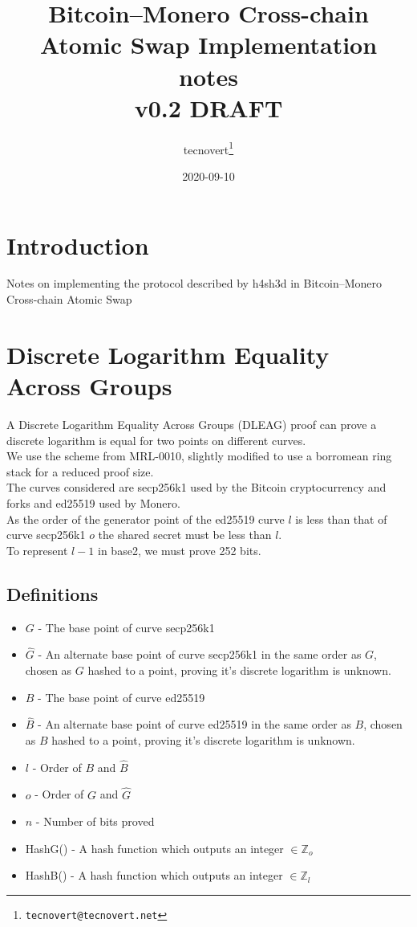 \documentclass[a4paper]{article}
\title{Bitcoin–Monero Cross-chain Atomic Swap Implementation notes\\
\normalsize v0.2 DRAFT}
\author{%
tecnovert\footnote{\texttt{tecnovert@tecnovert.net}}
}
\date{2020-09-10}
\begin{document}
\maketitle

\section{Introduction}
Notes on implementing the protocol described by h4sh3d in Bitcoin–Monero Cross-chain Atomic Swap\cite{h4sh3d:1}


\section{Discrete Logarithm Equality Across Groups}
A Discrete Logarithm Equality Across Groups (DLEAG) proof can prove a discrete logarithm is equal for two points on different curves.\\
We use the scheme from MRL-0010\cite{MRL:10}, slightly modified to use a borromean\cite{borromean} ring stack for a reduced proof size.
\\
The curves considered are secp256k1\cite{CerRes10} used by the Bitcoin\cite{nakamoto2008bitcoin} cryptocurrency and forks and ed25519\cite{ches-2011-24091} used by Monero\cite{van2013cryptonote}.\\
As the order of the generator point of the ed25519 curve $l$ is less than that of curve secp256k1 $o$ the shared secret must be less than $ l $.\\
To represent $l-1$ in base2, we must prove 252 bits.\\

\subsection{Definitions}
\begin{itemize}
    \item $G$   - The base point of curve secp256k1
    \item $\hat{G}$  - An alternate base point of curve secp256k1 in the same order as $G$, chosen as $G$ hashed to a point, proving it's discrete logarithm is unknown.
    \item $B$   - The base point of curve ed25519
    \item $\hat{B}$  - An alternate base point of curve ed25519 in the same order as $B$, chosen as $B$ hashed to a point, proving it's discrete logarithm is unknown.
    \item $l$   - Order of $B$ and $\hat{B}$
    \item $o$   - Order of $G$ and $\hat{G}$
    \item $n$   - Number of bits proved
    \item HashG() - A hash function which outputs an integer $\in \mathbb{Z}_{o}$
    \item HashB() - A hash function which outputs an integer $\in \mathbb{Z}_{l}$
\end{itemize}
\end{document}
